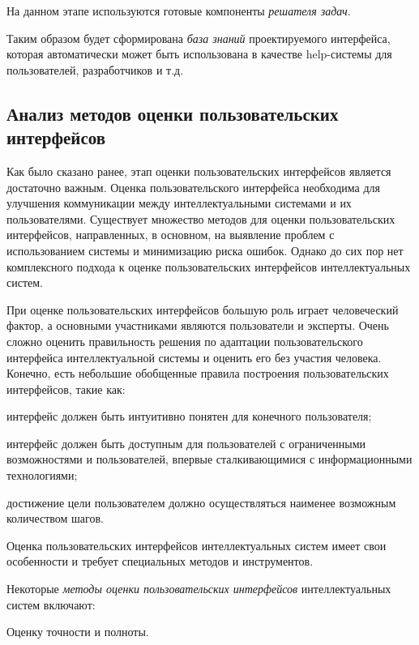 {На данном этапе используются готовые компоненты \textit{решателя задач}.

Таким образом будет сформирована \textit{база знаний} проектируемого интерфейса, которая автоматически может быть использована в качестве help-системы для пользователей, разработчиков и т.д.

\subsection{Анализ методов оценки пользовательских интерфейсов}
\label{sec_UI_analisys}

Как было сказано ранее, этап оценки пользовательских интерфейсов является достаточно важным. Оценка пользовательского интерфейса необходима для улучшения коммуникации между интеллектуальными системами и их пользователями. Существует множество методов для оценки пользовательских интерфейсов, направленных, в основном, на выявление проблем с использованием системы и минимизацию риска ошибок. Однако до сих пор нет комплексного подхода к оценке пользовательских интерфейсов интеллектуальных систем.

При оценке пользовательских интерфейсов большую роль играет человеческий фактор, а основными участниками являются пользователи и эксперты. Очень сложно оценить правильность решения по адаптации пользовательского интерфейса интеллектуальной системы и оценить его без участия человека. Конечно, есть небольшие обобщенные правила построения пользовательских интерфейсов, такие как:

\begin{textitemize}
	\item интерфейс должен быть интуитивно понятен для конечного пользователя;
	\item интерфейс должен быть доступным для пользователей с ограниченными возможностями и пользователей, впервые сталкивающимися с информационными технологиями;
	\item достижение цели пользователем должно осуществляться наименее возможным количеством шагов.
\end{textitemize}


Оценка пользовательских интерфейсов интеллектуальных систем имеет свои особенности и требует специальных методов и инструментов.

Некоторые \textit{методы оценки пользовательских интерфейсов} интеллектуальных систем включают:
\begin{textitemize}
	\item Оценку точности и полноты. 
	

\end{textitemize}}
